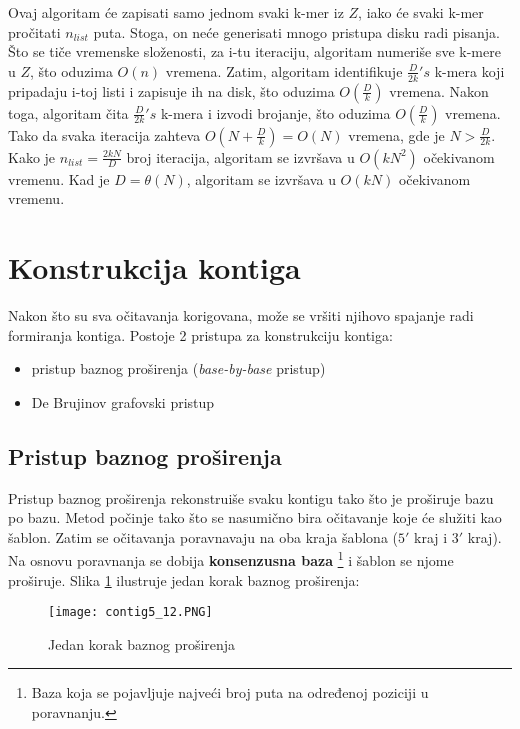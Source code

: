 \documentclass[12pt,oneside]{memoir}
\begin{document}
Ovaj algoritam će zapisati samo jednom svaki k-mer iz $Z$, iako će svaki k-mer pročitati $n_{list}$ puta. Stoga, on neće generisati mnogo pristupa disku radi pisanja. Što se tiče vremenske složenosti, za i-tu iteraciju, algoritam numeriše sve k-mere u $Z$, što oduzima $O(n)$ vremena. Zatim, algoritam identifikuje $\frac{D}{2k}'s$ k-mera koji pripadaju i-toj listi i zapisuje ih na disk, što oduzima $O(\frac{D}{k})$ vremena. Nakon toga, algoritam  čita $\frac{D}{2k}'s$ k-mera i izvodi brojanje, što oduzima $O(\frac{D}{k})$ vremena. Tako da svaka iteracija zahteva $O(N + \frac{D}{k}) = O(N)$ vremena, gde je $N > \frac{D}{2k}$. Kako je $n_{list} = \frac{2kN}{D}$ broj iteracija, algoritam se izvršava u $O(kN^2)$ očekivanom vremenu. Kad je $D = \theta(N)$, algoritam se izvršava u $O(kN)$ očekivanom vremenu.

\newpage

\section{Konstrukcija kontiga}

Nakon što su sva očitavanja korigovana, može se vršiti njihovo spajanje radi formiranja kontiga. Postoje 2 pristupa za konstrukciju kontiga:
\begin{itemize}
    \item{pristup baznog proširenja (\textit{base-by-base} pristup)}
    \item{De Brujinov grafovski pristup}
\end{itemize}

\subsection{Pristup baznog proširenja}

Pristup baznog proširenja rekonstruiše svaku kontigu tako što je proširuje bazu po bazu. Metod počinje tako što se nasumično bira očitavanje koje će služiti kao šablon. Zatim se očitavanja poravnavaju na oba kraja šablona ($5'$ kraj i $3'$ kraj). Na osnovu poravnanja se dobija \textbf{konsenzusna baza} \footnote{Baza koja se pojavljuje najveći broj puta na određenoj poziciji u poravnanju.} i šablon se njome proširuje. Slika \ref{fig:7} ilustruje jedan korak baznog proširenja:

\begin{figure}[!ht]
  \centering
  \texttt{[image: contig5\_12.PNG]}
\caption{Jedan korak baznog proširenja}
\label{fig:7}
\end{figure}
\end{document}
